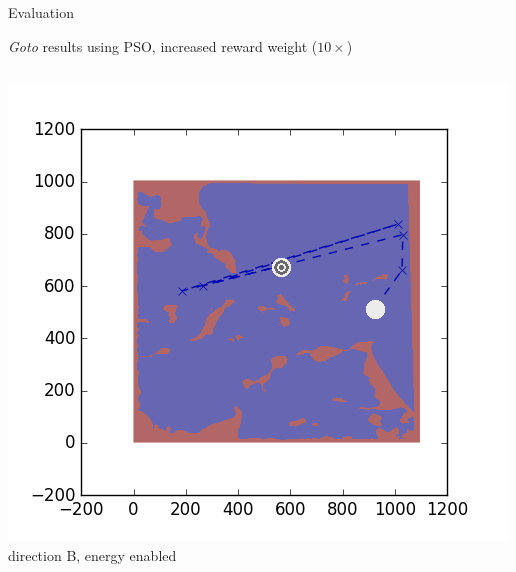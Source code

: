 \documentclass[9pt]{beamer}
\begin{document}
\begin{frame}{Evaluation}
\begin{block}{\textit{Goto} results using PSO, increased reward weight ($10\times$)}
\begin{columns}
\begin{column}{0.25\textwidth}
\begin{center}
                    \includegraphics[width=\textwidth,trim={2cm 2cm 2cm 2cm},clip]{img/EXP3RG_PathBb_-1_-1_-1_0d01.png}
                    \newline
                    \tiny{direction B, energy enabled}
                \end{center}
            \end{column}
        \end{columns}
    \end{block}
\end{frame}
\end{document}
